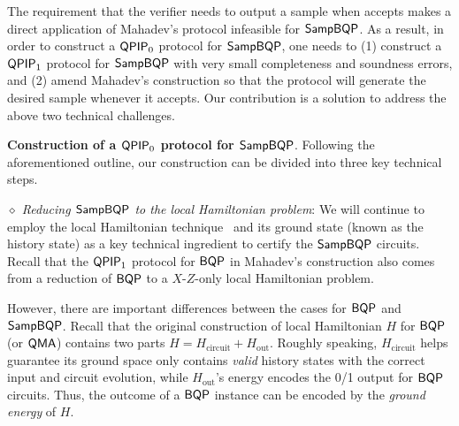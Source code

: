 The requirement that the verifier needs to output a sample when accepts makes a direct application of Mahadev's protocol infeasible for $\operatorname{\mathsf{SampBQP}}$. As a result, in order to construct a $\operatorname{\mathsf{QPIP}}_0$ protocol for $\operatorname{\mathsf{SampBQP}}$,  one needs to (1) construct a $\operatorname{\mathsf{QPIP}}_1$ protocol for $\operatorname{\mathsf{SampBQP}}$ with very small completeness and soundness errors, and (2) amend Mahadev's construction so that the protocol will generate the desired sample whenever it accepts. 
Our contribution is a solution to address the above two technical challenges. 

\vspace{2mm} \noindent \textbf{Construction of a $\operatorname{\mathsf{QPIP}}_0$ protocol for $\operatorname{\mathsf{SampBQP}}$}. 
Following the aforementioned outline, our construction can be divided into three key technical steps. 

\vspace{2mm} \noindent \emph{$\diamond$ Reducing  $\operatorname{\mathsf{SampBQP}}$ to the local Hamiltonian problem}: We will continue to employ the local Hamiltonian technique~\cite{kitaev2002classical} and its ground state (known as the history state) as a key technical ingredient to certify the $\operatorname{\mathsf{SampBQP}}$ circuits. 
Recall that the $\operatorname{\mathsf{QPIP}}_1$ protocol for $\operatorname{\mathsf{BQP}}$ in Mahadev's construction also comes from a reduction of $\operatorname{\mathsf{BQP}}$ to a $X$-$Z$-only local Hamiltonian problem. 

However, there are important differences between the cases for $\operatorname{\mathsf{BQP}}$ and $\operatorname{\mathsf{SampBQP}}$. Recall that the original construction of local Hamiltonian $H$ for $\operatorname{\mathsf{BQP}}$ (or $\operatorname{\mathsf{QMA}}$) contains two parts $H=H_{\mathrm{circuit}}+ H_{\mathrm{out}}$.
Roughly speaking, $H_{\mathrm{circuit}}$ helps guarantee its ground space only contains \emph{valid} history states with the correct input and circuit evolution, while $H_{\mathrm{out}}$'s energy encodes the 0/1 output for $\operatorname{\mathsf{BQP}}$ circuits.
Thus, the outcome of a $\operatorname{\mathsf{BQP}}$ instance can be encoded by the \emph{ground energy} of $H$.

